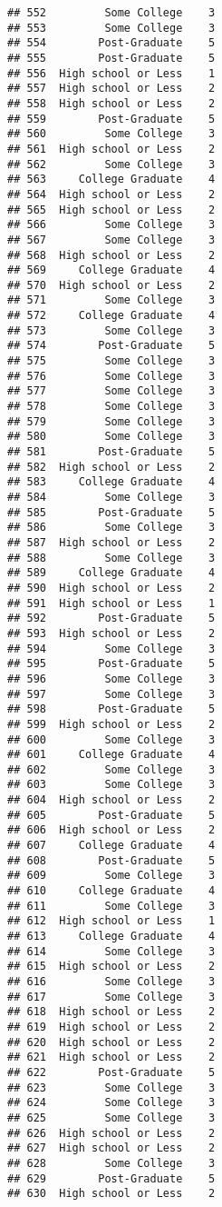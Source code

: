 \documentclass[
]{article}
\begin{document}
\begin{verbatim}
## 552         Some College    3
## 553         Some College    3
## 554        Post-Graduate    5
## 555        Post-Graduate    5
## 556  High school or Less    1
## 557  High school or Less    2
## 558  High school or Less    2
## 559        Post-Graduate    5
## 560         Some College    3
## 561  High school or Less    2
## 562         Some College    3
## 563     College Graduate    4
## 564  High school or Less    2
## 565  High school or Less    2
## 566         Some College    3
## 567         Some College    3
## 568  High school or Less    2
## 569     College Graduate    4
## 570  High school or Less    2
## 571         Some College    3
## 572     College Graduate    4
## 573         Some College    3
## 574        Post-Graduate    5
## 575         Some College    3
## 576         Some College    3
## 577         Some College    3
## 578         Some College    3
## 579         Some College    3
## 580         Some College    3
## 581        Post-Graduate    5
## 582  High school or Less    2
## 583     College Graduate    4
## 584         Some College    3
## 585        Post-Graduate    5
## 586         Some College    3
## 587  High school or Less    2
## 588         Some College    3
## 589     College Graduate    4
## 590  High school or Less    2
## 591  High school or Less    1
## 592        Post-Graduate    5
## 593  High school or Less    2
## 594         Some College    3
## 595        Post-Graduate    5
## 596         Some College    3
## 597         Some College    3
## 598        Post-Graduate    5
## 599  High school or Less    2
## 600         Some College    3
## 601     College Graduate    4
## 602         Some College    3
## 603         Some College    3
## 604  High school or Less    2
## 605        Post-Graduate    5
## 606  High school or Less    2
## 607     College Graduate    4
## 608        Post-Graduate    5
## 609         Some College    3
## 610     College Graduate    4
## 611         Some College    3
## 612  High school or Less    1
## 613     College Graduate    4
## 614         Some College    3
## 615  High school or Less    2
## 616         Some College    3
## 617         Some College    3
## 618  High school or Less    2
## 619  High school or Less    2
## 620  High school or Less    2
## 621  High school or Less    2
## 622        Post-Graduate    5
## 623         Some College    3
## 624         Some College    3
## 625         Some College    3
## 626  High school or Less    2
## 627  High school or Less    2
## 628         Some College    3
## 629        Post-Graduate    5
## 630  High school or Less    2

\end{verbatim}
\end{document}
